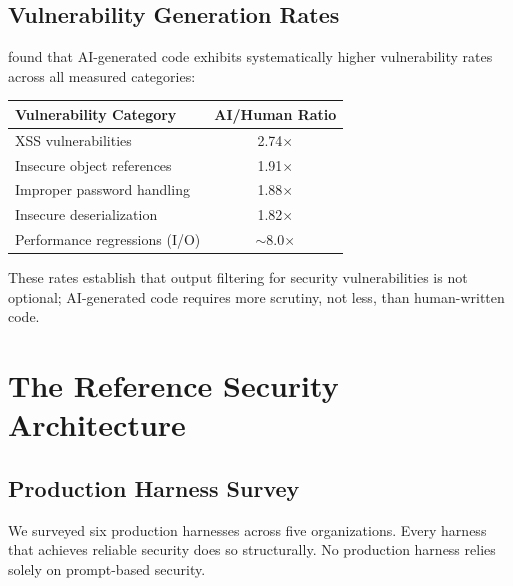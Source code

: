 \documentclass[11pt, a4paper, copyright]{googledeepmind}
\begin{document}
\subsection{Vulnerability Generation Rates}

\citet{coderabbit2025state} found that AI-generated code exhibits systematically higher vulnerability rates across all measured categories:

\begin{center}
\small
\begin{tabular}{lc}
\toprule
\textbf{Vulnerability Category} & \textbf{AI/Human Ratio} \\
\midrule
XSS vulnerabilities & 2.74$\times$ \\
Insecure object references & 1.91$\times$ \\
Improper password handling & 1.88$\times$ \\
Insecure deserialization & 1.82$\times$ \\
Performance regressions (I/O) & $\sim$8.0$\times$ \\
\bottomrule
\end{tabular}
\end{center}

These rates establish that output filtering for security vulnerabilities is not optional; AI-generated code requires more scrutiny, not less, than human-written code.


\section{The Reference Security Architecture}
\label{sec:reference}

\subsection{Production Harness Survey}

We surveyed six production harnesses across five organizations. Every harness that achieves reliable security does so structurally. No production harness relies solely on prompt-based security.
\end{document}
